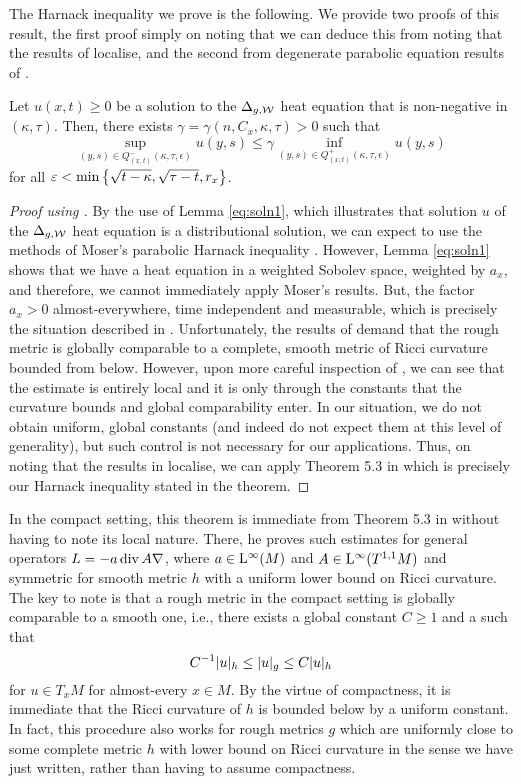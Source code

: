 \documentclass[a4paper, 12pt]{amsart}
\begin{document}
The Harnack inequality we prove is the following. We provide two proofs of this result, 
the first proof simply on noting that we can deduce this from noting that the results
of \cite{SC} localise, and the second from degenerate parabolic equation results of \cite{CS}.

\begin{thm}
\label{thm:Harnack}
Let $u(x,t) \geq 0$ be a
solution to the $\Delta_{g,\mathcal{W}}$ heat equation 
that is non-negative in $(\kappa, \tau)$. 
Then, there exists $\gamma = \gamma(n, C_x, \kappa, \tau) > 0$ such that 
$$ \sup_{(y,s) \in Q^-_{(x,t)}(\kappa, \tau,\epsilon)} u(y, s) 
	\leq \gamma \inf_{(y,s) \in Q^+_{(x,t)}(\kappa,\tau,\epsilon)} u(y,s)$$
for all $\varepsilon < \min\left\{ \sqrt{t - \kappa}, \sqrt{\tau - t}, r_x\right\}$.
\end{thm}

\begin{proof}[Proof using \cite{SC}]
By the use of Lemma \ref{eq:soln1}, which illustrates that solution $u$ of the $\Delta_{g,\mathcal{W}}$ heat equation is a distributional solution, we can expect to use the methods of Moser's parabolic Harnack inequality \cite{MR0159139,MR0288405}. However, Lemma \ref{eq:soln1} shows that we have a heat equation in a weighted Sobolev space, weighted by $a_x$, and therefore, we cannot immediately apply Moser's results. But, the factor $a_x > 0$ almost-everywhere, time independent and measurable, which is precisely the situation described in \cite[Section 4]{SC}.  Unfortunately, the results of \cite{SC} demand that the rough metric is globally comparable to a complete, smooth metric of Ricci curvature bounded from below. However, upon more careful inspection of \cite{SC}, we can see that the estimate is entirely local and it is only through the constants that the curvature bounds and global comparability enter. In our situation, we do not obtain uniform, global constants (and indeed do not expect them at this level of generality), but such control is not necessary for our applications. Thus, on noting that the results in \cite{SC} localise, we can apply Theorem 5.3 in \cite{SC} which is precisely our Harnack inequality stated in the theorem.
\end{proof}

In the compact setting, this theorem 
is immediate from Theorem 5.3 in \cite{SC} without having to note
its local nature. There, 
he proves such estimates for general operators
$L = -a \operatorname{div} A \nabla$, where $a \in {\rm L}^{\infty}_{\rm {}}(M)$
and $A \in {\rm L}^{\infty}_{\rm {}}(T^{1,1}M)$ and symmetric
for smooth metric $h$ with a uniform lower bound
on Ricci curvature.
The key to note is that a rough metric in the 
compact setting is globally comparable to a smooth one, 
i.e., there exists a global constant $C \geq 1$ 
and a 
such that
$$ C^{-1} |u|_{h} \leq |u|_g \leq C |u|_{h}$$
for $u \in T_x M$ for almost-every $x \in M$.
By the virtue of compactness, it is immediate
that the Ricci curvature of $h$ is bounded below
by a uniform constant. 
In fact, this procedure also works 
for rough metrics $g$ which 
are uniformly close to some complete metric $h$ with 
lower bound on Ricci curvature in the sense
we have just written, rather than having to assume compactness.
\end{document}
